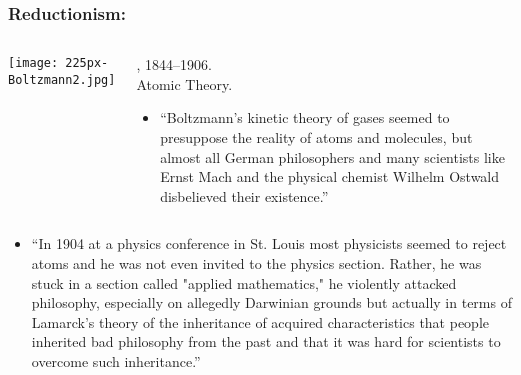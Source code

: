 \begin{frame}
  \frametitle{Reductionism:}

  \begin{columns}
    \texttt{[image: 225px-Boltzmann2.jpg]}\\
    \begin{block}{
        , 1844--1906.\\
        Atomic Theory.
      }
      \begin{itemize}
      \item
        \small
        ``Boltzmann's kinetic theory of gases seemed to presuppose the
        reality of atoms and molecules, but almost all German philosophers and
        many scientists like Ernst Mach and the physical chemist Wilhelm
        Ostwald disbelieved their existence.''
      \end{itemize}
    \end{block}
  \end{columns}

  \begin{block}{}
    \begin{itemize}
    \item 
      \small
      ``In 1904 at a physics conference in St. Louis most
      physicists seemed to reject atoms and he was not even invited
      to the physics section. Rather, he was stuck in a section
      called "applied mathematics," he violently attacked
      philosophy, especially on allegedly Darwinian grounds but
      actually in terms of Lamarck's theory of the inheritance of
      acquired characteristics that people inherited bad philosophy
      from the past and that it was hard for scientists to overcome
      such inheritance.''
    \end{itemize}
  \end{block}

\end{frame}

